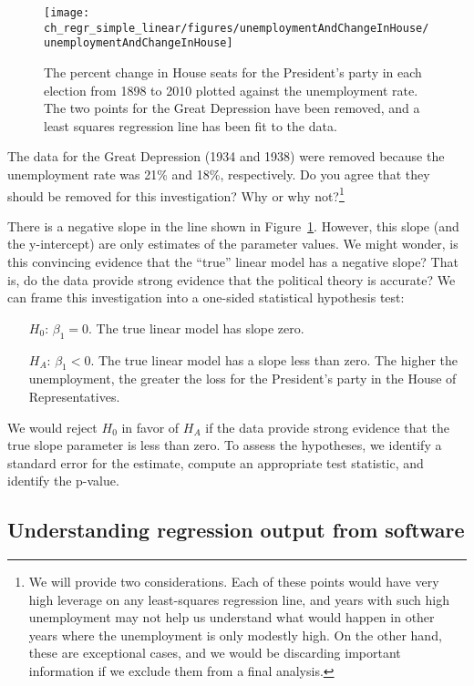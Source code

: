 \begin{figure}
\centering
\texttt{[image: ch\_regr\_simple\_linear/figures/unemploymentAndChangeInHouse/unemploymentAndChangeInHouse]}
\caption{The percent change in House seats for the President's party in each election from 1898 to 2010 plotted against the unemployment rate. The two points for the Great Depression have been removed, and a least squares regression line has been fit to the data.}
\label{unemploymentAndChangeInHouse}
\end{figure}

\begin{exercise}
The data for the Great Depression (1934 and 1938) were removed because the unemployment rate was 21\% and 18\%, respectively. Do you agree that they should be removed for this investigation? Why or why not?\footnote{We will provide two considerations. Each of these points would have very high leverage on any least-squares regression line, and years with such high unemployment may not help us understand what would happen in other years where the unemployment is only modestly high. On the other hand, these are exceptional cases, and we would be discarding important information if we exclude them from a final analysis.}
\end{exercise}

There is a negative slope in the line shown in Figure~\ref{unemploymentAndChangeInHouse}. However, this slope (and the y-intercept) are only estimates of the parameter values. We might wonder, is this convincing evidence that the ``true'' linear model has a negative slope? That is, do the data provide strong evidence that the political theory is accurate? We can frame this investigation into a one-sided statistical hypothesis test:
\begin{itemize}
\item[$H_0$:] $\beta_1 = 0$. The true linear model has slope zero.
\item[$H_A$:] $\beta_1 < 0$. The true linear model has a slope less than zero. The higher the unemployment, the greater the loss for the President's party in the House of Representatives.
\end{itemize}
We would reject $H_0$ in favor of $H_A$ if the data provide strong evidence that the true slope parameter is less than zero. To assess the hypotheses, we identify a standard error for the estimate, compute an appropriate test statistic, and identify the p-value.



\subsection{Understanding regression output from software}
\label{testStatisticForTheSlope}

